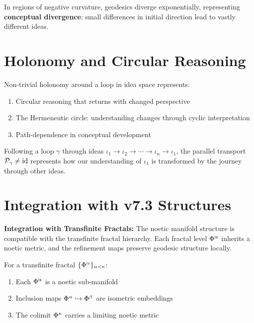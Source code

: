 \begin{definition}
\label{def:conceptual-divergence}
In regions of negative curvature, geodesics diverge exponentially, representing
\textbf{conceptual divergence}: small differences in initial direction lead
to vastly different ideas.
\end{definition}

\section{Holonomy and Circular Reasoning}

\begin{theorem}
\label{thm:holonomy-interpretation}
Non-trivial holonomy around a loop in idea space represents:
\begin{enumerate}[label=(\roman*)]
    \item Circular reasoning that returns with changed perspective
    \item The Hermeneutic circle: understanding changes through cyclic interpretation
    \item Path-dependence in conceptual development
\end{enumerate}
\end{theorem}

\begin{example}
\label{ex:hermeneutic}
Following a loop $\gamma$ through ideas $\iota_1 \to \iota_2 \to \cdots \to \iota_n \to \iota_1$,
the parallel transport $\mathcal{P}_\gamma \neq \mathrm{id}$ represents how
our understanding of $\iota_1$ is transformed by the journey through other ideas.
\end{example}

\section{Integration with v7.3 Structures}

\begin{tcolorbox}[colback=yellow!5!white,colframe=yellow!75!black,title=Cross-Reference: v7.3]
\textbf{Integration with Transfinite Fractals:} The noetic manifold structure
is compatible with the transfinite fractal hierarchy. Each fractal level
$\Phi^{\alpha}$ inherits a noetic metric, and the refinement maps
preserve geodesic structure locally.
\end{tcolorbox}

\begin{proposition}
\label{prop:fractal-geometric}
For a transfinite fractal $\{\Phi^{\alpha}\}_{\alpha < \kappa}$:
\begin{enumerate}[label=(\roman*)]
    \item Each $\Phi^{\alpha}$ is a noetic sub-manifold
    \item Inclusion maps $\Phi^{\alpha} \hookrightarrow \Phi^{\beta}$ are isometric embeddings
    \item The colimit $\Phi^{\kappa}$ carries a limiting noetic metric
\end{enumerate}
\end{proposition}

